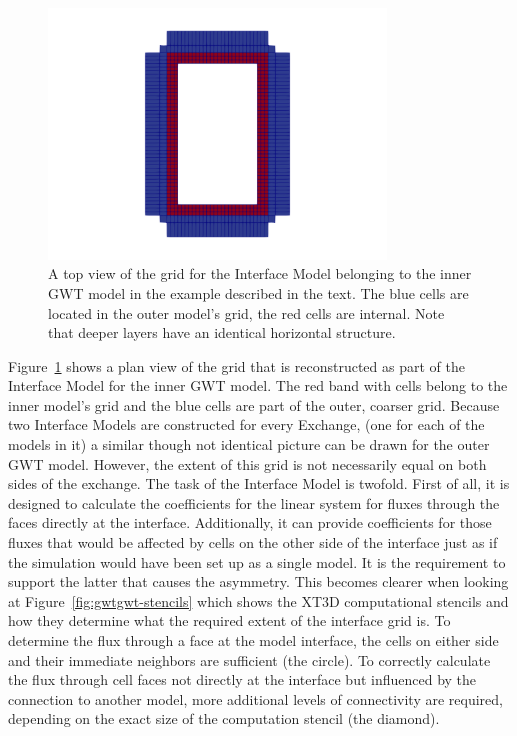\begin{figure}[!ht]
	\begin{center}
	\includegraphics[width=0.8\textwidth]{./Figures/InterfaceModel/gwt-ifmod-grid.png}
	\caption[A top view of the Interface Model grid]{A top view of the grid for the Interface Model belonging to the inner GWT model in the example described in the text. The blue cells are located in the outer model’s grid, the red cells are internal. Note that deeper layers have an identical horizontal structure.}
	\label{fig:gwtgwt-interface-grid}
	\end{center}
\end{figure}

Figure~\ref{fig:gwtgwt-interface-grid} shows a plan view of the grid that is reconstructed as part of the Interface Model for the inner GWT model. The red band with cells belong to the inner model’s grid and the blue cells are part of the outer, coarser grid. Because two Interface Models are constructed for every Exchange, (one for each of the models in it) a similar though not identical picture can be drawn for the outer GWT model. However, the extent of this grid is not necessarily equal on both sides of the exchange. The task of the Interface Model is twofold. First of all, it is designed to calculate the coefficients for the linear system for fluxes through the faces directly at the interface. Additionally, it can provide coefficients for those fluxes that would be affected by cells on the other side of the interface just as if the simulation would have been set up as a single model. It is the requirement to support the latter that causes the asymmetry. This becomes clearer when looking at Figure~\ref{fig:gwtgwt-stencils} which shows the XT3D computational stencils and how they determine what the required extent of the interface grid is. To determine the flux through a face at the model interface, the cells on either side and their immediate neighbors are sufficient (the circle). To correctly calculate the flux through cell faces not directly at the interface but influenced by the connection to another model, more additional levels of connectivity are required, depending on the exact size of the computation stencil (the diamond).


